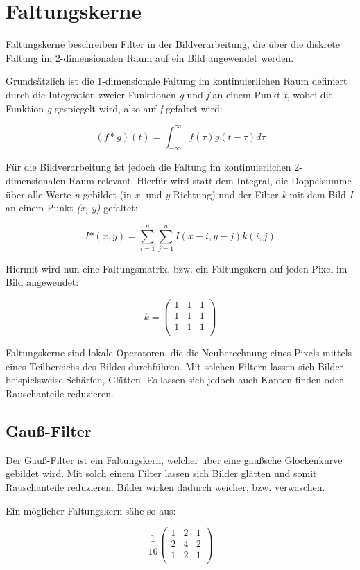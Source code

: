 \section{Faltungskerne} %
Faltungskerne beschreiben Filter in der Bildverarbeitung, die über die diskrete Faltung im 2-dimensionalen
Raum auf ein Bild angewendet werden.

Grundsätzlich ist die 1-dimensionale Faltung im kontinuierlichen Raum definiert durch die Integration zweier Funktionen {\em g} und {\em f} an einem Punkt {\em t}, wobei die Funktion {\em g} gespiegelt wird, also auf {\em f} gefaltet wird:

$$ (f * g)(t) = \int_{-\infty}^{\infty} f(\tau)g(t - \tau) d\tau $$

Für die Bildverarbeitung ist jedoch die Faltung im kontinuierlichen 2-dimensionalen Raum relevant.
Hierfür wird statt dem Integral, die Doppelsumme über alle Werte {\em n} gebildet (in {\em x}- und {\em y}-Richtung) und der Filter {\em k} mit dem Bild {\em I} an einem Punkt {\em (x, y)} gefaltet:

$$ I\mbox{*}(x, y) = \sum_{i=1}^{n}\sum_{j=1}^{n} I(x - i, y - j)k(i, j) $$

Hiermit wird nun eine Faltungsmatrix, bzw. ein Faltungskern auf jeden Pixel im Bild angewendet:

$$ k = \left( \begin{array}{rrr}
1 & 1 & 1 \\
1 & 1 & 1 \\
1 & 1 & 1 \\
\end{array}\right) $$

Faltungskerne sind lokale Operatoren, die die Neuberechnung eines Pixels mittels eines Teilbereichs des Bildes durchführen.
Mit solchen Filtern lassen sich Bilder beispielsweise Schärfen, Glätten. Es lassen sich jedoch auch Kanten finden oder Rauschanteile reduzieren.

\subsection{Gauß-Filter}
Der Gauß-Filter ist ein Faltungskern, welcher über eine gaußsche Glockenkurve gebildet wird.
Mit solch einem Filter lassen sich Bilder glätten und somit Rauschanteile reduzieren.
Bilder wirken dadurch weicher, bzw. verwaschen.

Ein möglicher Faltungskern sähe so aus:

$$ \frac{1}{16} \left( \begin{array}{rrr}
1 & 2 & 1 \\
2 & 4 & 2 \\
1 & 2 & 1 \\
\end{array}\right) $$

